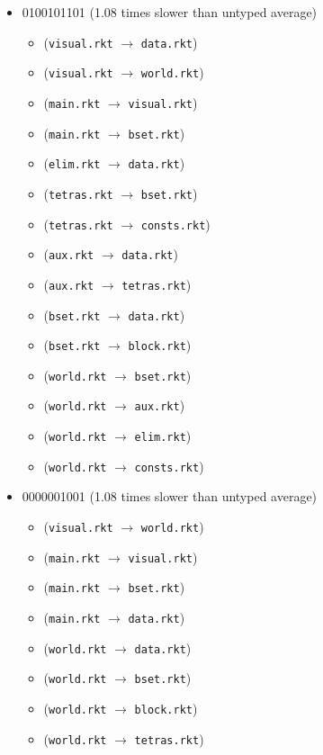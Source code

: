 \documentclass{article}
\newcommand{\mono}[1]{\texttt{#1}}
\begin{document}
\begin{itemize}
\begin{itemize}
  \end{itemize}
\item 0100101101 (1.08 times slower than untyped average)
  \begin{itemize}
  \item (\mono{visual.rkt} $\rightarrow$ \mono{data.rkt})
  \item (\mono{visual.rkt} $\rightarrow$ \mono{world.rkt})
  \item (\mono{main.rkt} $\rightarrow$ \mono{visual.rkt})
  \item (\mono{main.rkt} $\rightarrow$ \mono{bset.rkt})
  \item (\mono{elim.rkt} $\rightarrow$ \mono{data.rkt})
  \item (\mono{tetras.rkt} $\rightarrow$ \mono{bset.rkt})
  \item (\mono{tetras.rkt} $\rightarrow$ \mono{consts.rkt})
  \item (\mono{aux.rkt} $\rightarrow$ \mono{data.rkt})
  \item (\mono{aux.rkt} $\rightarrow$ \mono{tetras.rkt})
  \item (\mono{bset.rkt} $\rightarrow$ \mono{data.rkt})
  \item (\mono{bset.rkt} $\rightarrow$ \mono{block.rkt})
  \item (\mono{world.rkt} $\rightarrow$ \mono{bset.rkt})
  \item (\mono{world.rkt} $\rightarrow$ \mono{aux.rkt})
  \item (\mono{world.rkt} $\rightarrow$ \mono{elim.rkt})
  \item (\mono{world.rkt} $\rightarrow$ \mono{consts.rkt})
  \end{itemize}
\item 0000001001 (1.08 times slower than untyped average)
  \begin{itemize}
  \item (\mono{visual.rkt} $\rightarrow$ \mono{world.rkt})
  \item (\mono{main.rkt} $\rightarrow$ \mono{visual.rkt})
  \item (\mono{main.rkt} $\rightarrow$ \mono{bset.rkt})
  \item (\mono{main.rkt} $\rightarrow$ \mono{data.rkt})
  \item (\mono{world.rkt} $\rightarrow$ \mono{data.rkt})
  \item (\mono{world.rkt} $\rightarrow$ \mono{bset.rkt})
  \item (\mono{world.rkt} $\rightarrow$ \mono{block.rkt})
  \item (\mono{world.rkt} $\rightarrow$ \mono{tetras.rkt})

\end{itemize}
\end{itemize}
\end{document}
